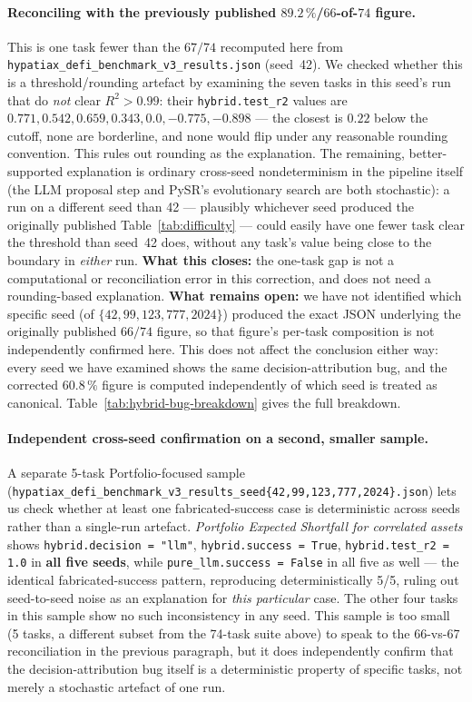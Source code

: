 \documentclass[twoside,11pt]{article}
\newcommand{\Rsq}{R^{2}}
\begin{document}
\paragraph{Reconciling with the previously published $89.2\,\%$/$66$-of-$74$
figure.} This is one task fewer than the $67/74$ recomputed here from
\texttt{hypatiax\_defi\_benchmark\_v3\_results.json} (seed~42). We checked
whether this is a threshold/rounding artefact by examining the seven tasks
in this seed's run that do \emph{not} clear $\Rsq > 0.99$: their
\texttt{hybrid.test\_r2} values are $0.771, 0.542, 0.659, 0.343, 0.0,
-0.775, -0.898$ --- the closest is $0.22$ below the cutoff, none are
borderline, and none would flip under any reasonable rounding convention.
This rules out rounding as the explanation. The remaining, better-supported
explanation is ordinary cross-seed nondeterminism in the pipeline itself
(the LLM proposal step and PySR's evolutionary search are both stochastic):
a run on a different seed than 42 --- plausibly whichever seed produced the
originally published Table~\ref{tab:difficulty} --- could easily have one
fewer task clear the threshold than seed~42 does, without any task's value
being close to the boundary in \emph{either} run. \textbf{What this closes:}
the one-task gap is not a computational or reconciliation error in this
correction, and does not need a rounding-based explanation. \textbf{What
remains open:} we have not identified which specific seed (of $\{42, 99,
123, 777, 2024\}$) produced the exact JSON underlying the originally
published $66/74$ figure, so that figure's per-task composition is not
independently confirmed here. This does not affect the conclusion either
way: every seed we have examined shows the same decision-attribution bug,
and the corrected $60.8\,\%$ figure is computed independently of which seed
is treated as canonical. Table~\ref{tab:hybrid-bug-breakdown}
gives the full breakdown.

\paragraph{Independent cross-seed confirmation on a second, smaller sample.}
A separate 5-task Portfolio-focused sample
(\texttt{hypatiax\_defi\_benchmark\_v3\_results\_seed\{42,99,123,777,2024\}.json})
lets us check whether at least one fabricated-success case is deterministic
across seeds rather than a single-run artefact. \emph{Portfolio Expected
Shortfall for correlated assets} shows \texttt{hybrid.decision = "llm"},
\texttt{hybrid.success = True}, \texttt{hybrid.test\_r2 = 1.0} in
\textbf{all five seeds}, while \texttt{pure\_llm.success = False} in all
five as well --- the identical fabricated-success pattern, reproducing
deterministically 5/5, ruling out seed-to-seed noise as an explanation for
\emph{this particular} case. The other four tasks in this sample show no
such inconsistency in any seed. This sample is too small (5 tasks, a
different subset from the 74-task suite above) to speak to the 66-vs-67
reconciliation in the previous paragraph, but it does independently confirm
that the decision-attribution bug itself is a deterministic property of
specific tasks, not merely a stochastic artefact of one run.
\end{document}
